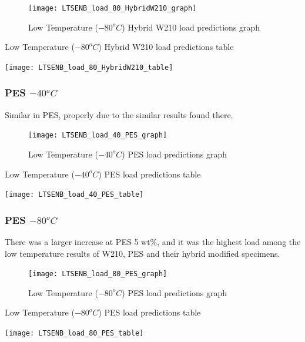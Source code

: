 \documentclass[numbers=noendperiod,chapterprefix=on]{icldt} %
\begin{document}
{\begin{figure}[!hp]
  \centering
  \texttt{[image: LTSENB\_load\_80\_HybridW210\_graph]}\label{LTSENB_load_80_HybridW210_graph}
  \caption{Low Temperature ($ -80 ^{o}C$) Hybrid W210 load predictions graph}
  \end{figure}
 \FloatBarrier
 
 \begin{table}
    \centering
    \caption{Low Temperature ($ -80 ^{o}C$) Hybrid W210 load predictions table}\label{LTSENB_load_80_HybridW210_table}
    \texttt{[image: LTSENB\_load\_80\_HybridW210\_table]}
    \end{table}
    \FloatBarrier

\subsubsection{\space PES $ -40 ^{o}C$}
Similar in PES, properly due to the similar results found there.

\begin{figure}[!hp]
  \centering
  \texttt{[image: LTSENB\_load\_40\_PES\_graph]}\label{LTSENB_load_40_PES_graph}
  \caption{Low Temperature ($ -40 ^{o}C$) PES load predictions graph}
  \end{figure}
 \FloatBarrier
 
 \begin{table}
    \centering
    \caption{Low Temperature ($ -40 ^{o}C$) PES load predictions table}\label{LTSENB_load_40_PES_table}
    \texttt{[image: LTSENB\_load\_40\_PES\_table]}
    \end{table}
    \FloatBarrier
     
\subsubsection{\space PES $ -80 ^{o}C$}
There was a larger increase at PES 5 wt\%, and it was the highest load among the low temperature results of W210, PES and their hybrid modified specimens.

\begin{figure}[!hp]
  \centering
  \texttt{[image: LTSENB\_load\_80\_PES\_graph]}\label{LTSENB_load_80_PES_graph}
  \caption{Low Temperature ($ -80 ^{o}C$) PES load predictions graph}
  \end{figure}
 \FloatBarrier
 
 \begin{table}
    \centering
    \caption{Low Temperature ($ -80 ^{o}C$) PES load predictions table}\label{LTSENB_load_80_PES_table}
    \texttt{[image: LTSENB\_load\_80\_PES\_table]}
    \end{table}
    \FloatBarrier
     
}
\end{document}
